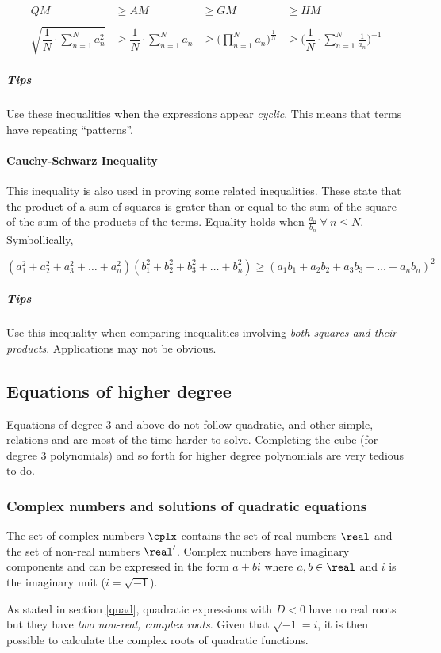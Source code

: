\begin{align*}
  QM &\geq AM &\geq GM &\geq HM \\ \\
  \sqrt{\dfrac{1}{N}\cdot \sum\limits_{n=1}^{N} a_n^2} &\geq \dfrac{1}{N}\cdot \sum\limits_{n=1}^{N} a_n &\geq \Big(\prod_{n=1}^{N}a_n \Big)^{\frac{1}{N}} &\geq \Big(\dfrac{1}{N}\cdot \sum\limits_{n=1}^{N}\frac{1}{a_n}\Big)^{-1}
\end{align*}

\subparagraph{Tips}
Use these inequalities when the expressions appear \emph{cyclic}.
This means that terms have repeating ``patterns''.

\paragraph{Cauchy-Schwarz Inequality}
This inequality is also used in proving some related inequalities.
These state that the product of a sum of squares is grater than or equal to the sum of the square of the sum of the products of the terms.
Equality holds when $\frac{a_n}{b_n}\ \forall\ n\leq N$.
Symbollically,

$$
(a_1^2+a_2^2+a_3^2+\ldots +a_n^2)(b_1^2+b_2^2+b_3^2+\ldots +b_n^2) \geq (a_1b_1+a_2b_2+a_3b_3+\ldots +a_nb_n)^2 
$$

\subparagraph{Tips}
Use this inequality when comparing inequalities involving \emph{both squares and their products}.
Applications may not be obvious.

\subsection{Equations of higher degree}
Equations of degree $3$ and above do not follow quadratic, and other simple, relations and are most of the time harder to solve.
Completing the cube (for degree 3 polynomials) and so forth for higher degree polynomials are very tedious to do.

\subsubsection{Complex numbers and solutions of quadratic equations}
The set of complex numbers $\cplx$ contains the set of real numbers $\real$ and the set of non-real numbers $\real '$.
Complex numbers have imaginary components and can be expressed in the form $a + bi$ where $a, b \in \real$ and $i$ is the imaginary unit ($i = \sqrt{-1}$).

As stated in section \ref{quad}, quadratic expressions with $D < 0$ have no real roots but they have \emph{two non-real, complex roots}.
Given that $\sqrt{-1} = i$, it is then possible to calculate the complex roots of quadratic functions.

